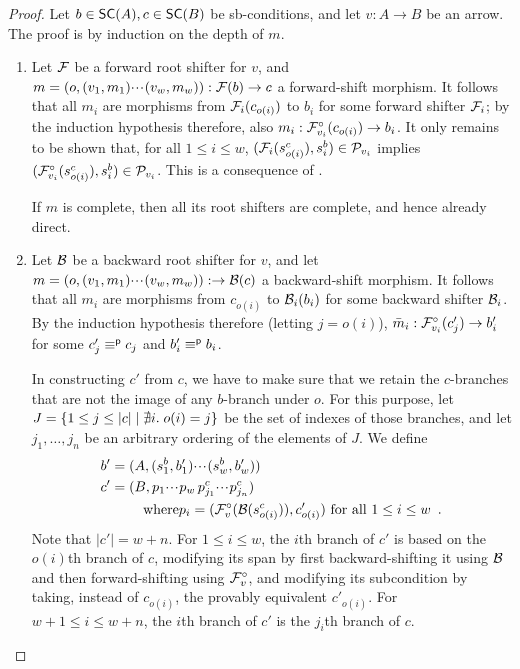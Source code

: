\begin{proof}
Let $b\in \SC A,c\in \SC B$ be sb-conditions, and let $v:A\to B$ be an arrow. The proof is by induction on the depth of $m$.
\begin{enumerate}[topsep=\smallskipamount]
\item Let $\mathcal{F}$ be a forward root shifter for $v$, and $m=(o,(v_1,m_1){\cdotp\mkern-2mu\cdotp\mkern-2mu\cdotp\mkern1mu}(v_w,m_w)):\mathcal{F}(b)\to c$ a forward-shift morphism. It follows that all $m_i$ are morphisms from $\mathcal{F}_i(c_{o(i)})$ to $b_i$ for some forward shifter $\mathcal{F}_i$; by the induction hypothesis therefore, also $m_i:\mathcal{F}^\circ_{v_i}(c_{o(i)})\to b_i$. It only remains to be shown that, for all $1\leq i\leq w$, $(\mathcal{F}_i(s^c_{o(i)}),s^b_i)\in \mathcal{P}_{v_i}$ implies $(\mathcal{F}^\circ_{v_i}(s^c_{o(i)}),s^b_i)\in \mathcal{P}_{v_i}$. This is a consequence of .

\smallskip
If $m$ is complete, then all its root shifters are complete, and hence already direct.

\item Let $\mathcal{B}$ be a backward root shifter for $v$, and let $m=(o,(v_1,m_1){\cdotp\mkern-2mu\cdotp\mkern-2mu\cdotp\mkern1mu}(v_w,m_w)):\to \mathcal{B}(c)$ a backward-shift morphism. It follows that all $m_i$ are morphisms from $c_{o(i)}$ to $\mathcal{B}_i(b_i)$ for some backward shifter $\mathcal{B}_i$. By the induction hypothesis therefore (letting $j=o(i)$), $\bar m_i:\mathcal{F}^\circ_{v_i}(c_j')\to b_i'$ for some $c_j'\equiv^{\mathsf p} c_j$ and $b'_i\equiv^{\mathsf p} b_i$.

\smallskip
In constructing $c'$ from $c$, we have to make sure that we retain the $c$-branches that are not the image of any $b$-branch under $o$. For this purpose, let $J=\{{1\leq j\leq |c|\mid \nexists i.\; o(i)=j}\}$ be the set of indexes of those branches, and let $j_1,\ldots,j_n$ be an arbitrary ordering of the elements of $J$. We define 
\begin{align*}
b'=\;&(A,(s^b_1,b'_1){\cdotp\mkern-2mu\cdotp\mkern-2mu\cdotp\mkern1mu} (s^b_w,b'_w)) \\
c'=\;&(B,p_1{\cdotp\mkern-2mu\cdotp\mkern-2mu\cdotp\mkern1mu} p_w\,p^c_{j_1}{\cdotp\mkern-2mu\cdotp\mkern-2mu\cdotp\mkern1mu} p^c_{j_n}) \\
   & \quad\text{where} p_i = (\mathcal{F}^\circ_{v}(\mathcal{B}(s^c_{o(i)})),c'_{o(i)}) \text{ for all $1\leq i\leq w$}\enspace.
\end{align*}
%
Note that $|c'|=w+n$. For $1\leq i\leq w$, the $i$th branch of $c'$ is based on the $o(i)$th branch of $c$, modifying its span by first backward-shifting it using $\mathcal{B}$ and then forward-shifting using $\mathcal{F}^\circ_{v}$, and modifying its subcondition by taking, instead of $c_{o(i)}$, the provably equivalent $c'_{o(i)}$. For $w+1\leq i\leq w+n$, the $i$th branch of $c'$ is the $j_i$th branch of $c$.


\end{enumerate}
\end{proof}
